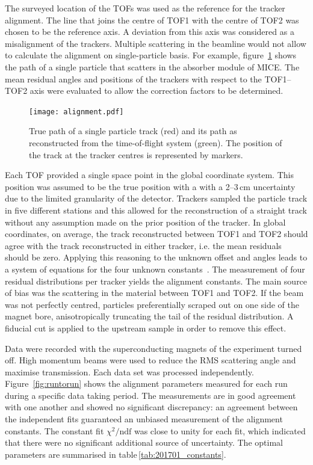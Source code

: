 The surveyed location of the TOFs was used as the reference for the tracker alignment. The line that joins the centre of TOF1 with the centre of TOF2 was chosen to be the reference axis. A deviation from this axis was considered as a misalignment of the trackers. Multiple scattering in the beamline would not allow to calculate the alignment on single-particle basis. For example, figure~\ref{fig:align_bl} shows the path of a single particle that scatters in the absorber module of MICE.
 The mean residual angles and positions of the trackers with respect to the TOF1--TOF2 axis were evaluated to allow the correction factors to be determined.

\begin{figure}
	\begin{center}
		\texttt{[image: alignment.pdf]}
	\end{center}
	\caption{
		True path of a single particle track (red) and its path as reconstructed from the time-of-flight system (green). The position of the track at the tracker centres is represented by markers.
	}
	\label{fig:align_bl}
\end{figure}

Each TOF provided a single space point in the global coordinate system. This position was assumed to be the true position with a with a 2--3\,cm uncertainty due to the limited granularity of the detector.
Trackers sampled the particle track in five different stations and this allowed for the reconstruction of a straight track without any assumption made on the prior position of the tracker.
In global coordinates, on average, the track reconstructed between TOF1 and TOF2 should agree with the track reconstructed in either tracker, i.e. the mean residuals should be zero. Applying this reasoning to the unknown offset and angles leads to a system of equations for the four unknown constants~\cite{2018arXiv1805.06623T}.
The measurement of four residual distributions per tracker yields the alignment constants.
The main source of bias was the scattering in the material between TOF1 and TOF2. If the beam was not perfectly centred, particles preferentially scraped out on one side of the magnet bore, anisotropically truncating the tail of the residual distribution.
A fiducial cut is applied to the upstream sample in order to remove this effect.

Data were recorded with the superconducting magnets of the experiment turned off. High momentum beams were used to reduce the RMS scattering angle and maximise transmission.  
Each data set was processed independently. Figure~\ref{fig:runtorun} shows the alignment parameters measured for each run during a specific data taking period. The measurements are in good agreement with one another and showed no significant discrepancy: an agreement between the independent fits guaranteed an unbiased measurement of the alignment constants. The constant fit $\chi^2/\text{ndf}$ was close to unity for each fit, which indicated that there were no significant additional source of uncertainty. The optimal parameters are summarised in table\,\ref{tab:201701_constants}. 

